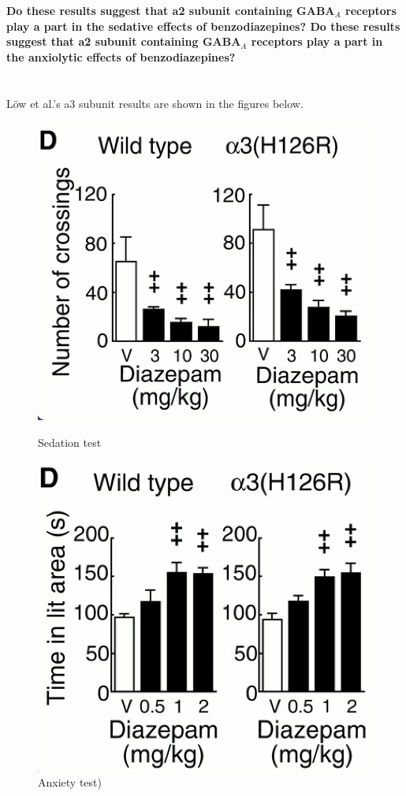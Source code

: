 \documentclass{article}
\begin{document}
\FloatBarrier
\textbf{Do these results suggest that a2 subunit containing GABA$_A$ receptors play a part in the sedative effects of benzodiazepines? Do these results suggest that a2 subunit containing GABA$_A$ receptors play a part in the anxiolytic effects of benzodiazepines?}

\section{}
Löw et al.'s a3 subunit results are shown in the figures below.

\FloatBarrier
\begin{figure}[H]
\centering
\begin{minipage}{.4\textwidth}
  \includegraphics[width=.99\linewidth]{a3_sedation.png}
  \caption{Sedation test}
  \label{fig:test1}
\end{minipage}%
\begin{minipage}{.4\textwidth}
  \centering
  \includegraphics[width=.8\linewidth]{a3_anxiety.png}
  \caption{Anxiety test)}
  \label{fig:test2}
\end{minipage}
\end{figure}
\end{document}
